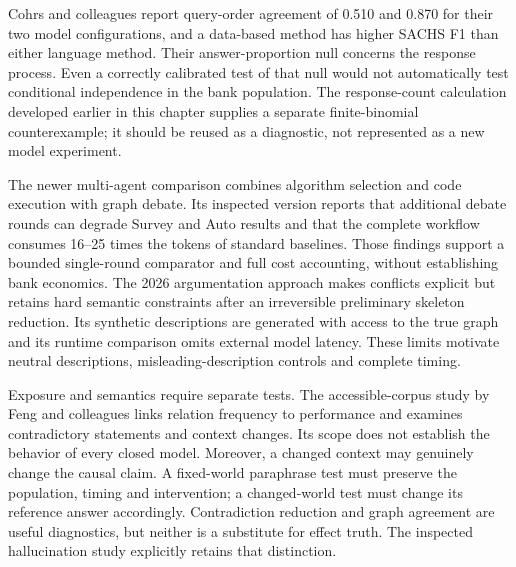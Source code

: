 Cohrs and colleagues report query-order agreement of 0.510 and 0.870 for
their two model configurations, and a data-based method has higher SACHS
F1 than either language method. Their answer-proportion null concerns
the response process. Even a correctly calibrated test of that null
would not automatically test conditional independence in the bank
population. \citep{v12_la_2406_07378} The response-count calculation
developed earlier in this chapter supplies a separate finite-binomial
counterexample; it should be reused as a diagnostic, not represented as
a new model experiment.

The newer multi-agent comparison combines algorithm selection and code
execution with graph debate. Its inspected version reports that
additional debate rounds can degrade Survey and Auto results and that
the complete workflow consumes 16--25 times the tokens of standard
baselines. Those findings support a bounded single-round comparator and
full cost accounting, without establishing bank economics.
\citep{v12_la_2407_15073} The 2026 argumentation approach makes
conflicts explicit but retains hard semantic constraints after an
irreversible preliminary skeleton reduction. Its synthetic descriptions
are generated with access to the true graph and its runtime comparison
omits external model latency. These limits motivate neutral
descriptions, misleading-description controls and complete timing.
\citep{exec14_expert_argumentation}

Exposure and semantics require separate tests. The accessible-corpus
study by Feng and colleagues links relation frequency to performance and
examines contradictory statements and context changes. Its scope does
not establish the behavior of every closed model. Moreover, a changed
context may genuinely change the causal claim. A fixed-world paraphrase
test must preserve the population, timing and intervention; a
changed-world test must change its reference answer accordingly.
\citep{v12_la_2407_19638} Contradiction reduction and graph agreement
are useful diagnostics, but neither is a substitute for effect truth.
The inspected hallucination study explicitly retains that distinction.
\citep{exec13_hallucination}

